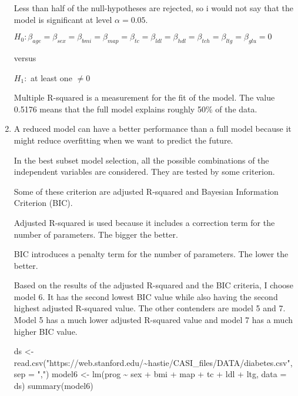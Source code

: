 \documentclass[
]{article}
\newenvironment{Shaded}{\begin{snugshade}}{\end{snugshade}}
\newcommand{\AttributeTok}[1]{\textcolor[rgb]{0.77,0.63,0.00}{#1}}
\newcommand{\FunctionTok}[1]{\textcolor[rgb]{0.00,0.00,0.00}{#1}}
\newcommand{\NormalTok}[1]{#1}
\newcommand{\OtherTok}[1]{\textcolor[rgb]{0.56,0.35,0.01}{#1}}
\newcommand{\SpecialCharTok}[1]{\textcolor[rgb]{0.00,0.00,0.00}{#1}}
\newcommand{\StringTok}[1]{\textcolor[rgb]{0.31,0.60,0.02}{#1}}
\begin{document}
\begin{enumerate}
  Less than half of the null-hypotheses are rejected, so i would not say
  that the model is significant at level \(\alpha = 0.05\).

  \(H_0: \beta_{age} = \beta_{sex} =\beta_{bmi} =\beta_{map} =\beta_{tc} =\beta_{ldl} =\beta_{hdl} =\beta_{tch} =\beta_{ltg} =\beta_{glu} = 0\)

  versus

  \(H_1:\) at least one \(\ne 0\)

  Multiple R-squared is a measurement for the fit of the model. The
  value 0.5176 means that the full model explains roughly 50\% of the
  data.
\item
  A reduced model can have a better performance than a full model
  because it might reduce overfitting when we want to predict the
  future.

  In the best subset model selection, all the possible combinations of
  the independent variables are considered. They are tested by some
  criterion.

  Some of these criterion are adjusted R-squared and Bayesian
  Information Criterion (BIC).

  Adjusted R-squared is used because it includes a correction term for
  the number of parameters. The bigger the better.

  BIC introduces a penalty term for the number of parameters. The lower
  the better.

  Based on the results of the adjusted R-squared and the BIC criteria, I
  choose model 6. It has the second lowest BIC value while also having
  the second highest adjusted R-squared value. The other contenders are
  model 5 and 7. Model 5 has a much lower adjusted R-squared value and
  model 7 has a much higher BIC value.

\begin{Shaded}
\begin{Highlighting}[]
\NormalTok{ds }\OtherTok{\textless{}{-}} \FunctionTok{read.csv}\NormalTok{(}\StringTok{"https://web.stanford.edu/\textasciitilde{}hastie/CASI\_files/DATA/diabetes.csv"}\NormalTok{, }\AttributeTok{sep =} \StringTok{","}\NormalTok{)}
\NormalTok{model6 }\OtherTok{\textless{}{-}} \FunctionTok{lm}\NormalTok{(prog }\SpecialCharTok{\textasciitilde{}}\NormalTok{ sex }\SpecialCharTok{+}\NormalTok{ bmi }\SpecialCharTok{+}\NormalTok{ map }\SpecialCharTok{+}\NormalTok{ tc }\SpecialCharTok{+}\NormalTok{ ldl }\SpecialCharTok{+}\NormalTok{ ltg, }\AttributeTok{data =}\NormalTok{ ds)}
\FunctionTok{summary}\NormalTok{(model6)}
\end{Highlighting}
\end{Shaded}


\end{enumerate}
\end{document}
